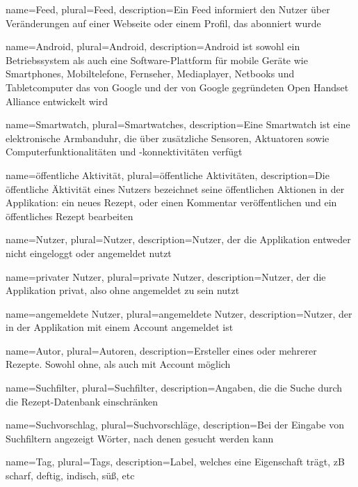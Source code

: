 {
	name=Feed,
	plural=Feed,
	description={Ein Feed informiert den Nutzer über Veränderungen auf einer Webseite oder einem Profil, das abonniert wurde}
}

{
	name=Android,
	plural=Android,
	description={Android ist sowohl ein Betriebssystem als auch eine Software-Plattform für mobile Geräte wie Smartphones, Mobiltelefone, Fernseher, Mediaplayer, Netbooks und Tabletcomputer das von Google und der von Google gegründeten Open Handset Alliance entwickelt wird}
}

{
	name=Smartwatch,
	plural=Smartwatches,
	description={Eine Smartwatch ist eine elektronische Armbanduhr, die über zusätzliche Sensoren, Aktuatoren sowie Computerfunktionalitäten und -konnektivitäten verfügt}
}

{
	name=öffentliche Aktivität,
	plural=öffentliche Aktivitäten,
	description={Die öffentliche Äktivität eines Nutzers bezeichnet seine öffentlichen Aktionen in der Applikation: ein neues Rezept, oder einen Kommentar veröffentlichen und ein öffentliches Rezept bearbeiten}
}

{
	name=Nutzer,
	plural=Nutzer,
	description={Nutzer, der die Applikation entweder nicht eingeloggt oder angemeldet nutzt}
}

{
	name=privater Nutzer,
	plural=private Nutzer,
	description={Nutzer, der die Applikation privat, also ohne angemeldet zu sein nutzt}
}

{
	name=angemeldete Nutzer,
	plural=angemeldete Nutzer,
	description={Nutzer, der in der Applikation mit einem Account angemeldet ist}
}

{
	name=Autor,
	plural=Autoren,
	description={Ersteller eines oder mehrerer Rezepte. Sowohl ohne, als auch mit Account möglich}
}

{
	name=Suchfilter,
	plural=Suchfilter,
	description={Angaben, die die Suche durch die Rezept-Datenbank einschränken}
}

{
	name=Suchvorschlag,
	plural=Suchvorschläge,
	description={Bei der Eingabe von Suchfiltern angezeigt Wörter, nach denen gesucht werden kann}
}

{
	name=Tag,
	plural=Tags,
	description={Label, welches eine Eigenschaft trägt, zB {\glqq scharf\grqq}, {\glqq deftig\grqq}, {\glqq indisch\grqq}, {\glqq süß\grqq}, etc}
}

